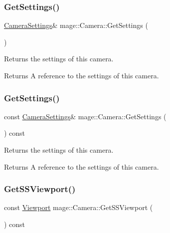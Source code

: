 \subsubsection{\texorpdfstring{Get\+Settings()}{GetSettings()}\hspace{0.1cm}{\footnotesize\ttfamily [1/2]}}
{\footnotesize\ttfamily \hyperlink{classmage_1_1_camera_settings}{Camera\+Settings}\& mage\+::\+Camera\+::\+Get\+Settings (\begin{DoxyParamCaption}{ }\end{DoxyParamCaption})\hspace{0.3cm}{\ttfamily [noexcept]}}

Returns the settings of this camera.

\begin{DoxyReturn}{Returns}
A reference to the settings of this camera. 
\end{DoxyReturn}
\hypertarget{classmage_1_1_camera_a0174b0d44d749a678acb388b4a60b8c9}{}\label{classmage_1_1_camera_a0174b0d44d749a678acb388b4a60b8c9} 
\subsubsection{\texorpdfstring{Get\+Settings()}{GetSettings()}\hspace{0.1cm}{\footnotesize\ttfamily [2/2]}}
{\footnotesize\ttfamily const \hyperlink{classmage_1_1_camera_settings}{Camera\+Settings}\& mage\+::\+Camera\+::\+Get\+Settings (\begin{DoxyParamCaption}{ }\end{DoxyParamCaption}) const\hspace{0.3cm}{\ttfamily [noexcept]}}

Returns the settings of this camera.

\begin{DoxyReturn}{Returns}
A reference to the settings of this camera. 
\end{DoxyReturn}
\hypertarget{classmage_1_1_camera_aa82c733bd7c71518fa4c0b189f87277f}{}\label{classmage_1_1_camera_aa82c733bd7c71518fa4c0b189f87277f} 
\subsubsection{\texorpdfstring{Get\+S\+S\+Viewport()}{GetSSViewport()}}
{\footnotesize\ttfamily const \hyperlink{classmage_1_1_viewport}{Viewport} mage\+::\+Camera\+::\+Get\+S\+S\+Viewport (\begin{DoxyParamCaption}{ }\end{DoxyParamCaption}) const\hspace{0.3cm}{\ttfamily [noexcept]}}

